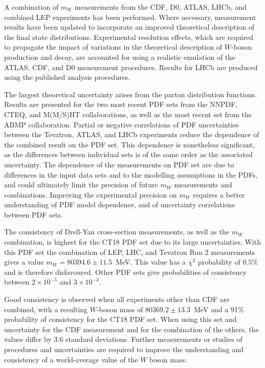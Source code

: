 
A combination of $m_W$ measurements from the CDF, D0, ATLAS, LHCb, and combined LEP experiments has been performed.
Where necessary, measurement results have been updated to incorporate an improved theoretical description of the 
final state distributions. Experimental resolution effects, which are required to propagate the impact of variations
in the theoretical description of $W$-boson production and decay, are accounted for using a realistic emulation of
the ATLAS, CDF, and D0 measurement procedures.  Results for LHCb are produced using the published analysis procedures.
 
The largest theoretical uncertainty arises from the parton distribution functions.  Results are presented for the two
most recent PDF sets from the NNPDF, CTEQ, and M(M/S)HT collaborations, as well as the most recent set from the ABMP
collaboration.  Partial or negative correlations of PDF uncertainties between the Tevatron, ATLAS, and LHCb experiments
reduce the dependence of the combined result on the PDF set.  This dependence is nonetheless significant, as the differences
between individual sets is of the same order as the associated uncertainty.  The dependence
of the measurements on PDF set are due to differences in the input data sets and to the modelling assumptions in the PDFs,
and could ultimately limit the precision of future $m_W$ measurements and combinations. Improving the experimental
precision on $m_W$ requires a better understanding of PDF model dependence, and of uncertainty correlations between PDF
sets.

The consistency of Drell-Yan cross-section measurements, as well as the $m_W$ combination, is highest for the CT18 PDF
set due to its large uncertainties.  With this PDF set the combination of LEP, LHC, and Tevatron Run 2 measurements
gives a value $m_W = 80394.6 \pm 11.5$~MeV.  This value has a $\chi^2$ probability of $0.5\%$ and is therefore disfavoured.
Other PDF sets give probabilities of consistency between $2\times 10^{-5}$ and $3\times 10^{-3}$.

Good consistency is observed when all experiments other than CDF are combined, with a resulting $W$-boson mass of
$80369.2 \pm 13.3$~MeV and a 91\% probability of consistency for the CT18 PDF set.  When using this set and uncertainty
for the CDF measurement and for the combination of the others, the values differ by 3.6 standard deviations.  Further
measurements or studies of procedures and uncertainties are required to improve the understanding and consistency of a 
world-average value of the $W$ boson mass.
